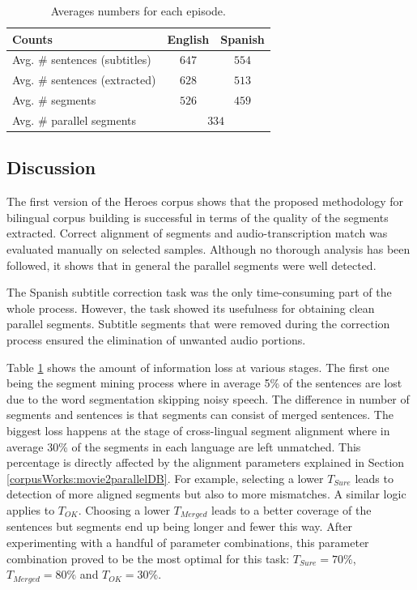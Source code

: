\begin{table}[ht]
\centering
\begin{tabular}{lcc}
\toprule
 \textbf{Counts} & \textbf{English} & \textbf{Spanish} \\  \midrule
{Avg. \# sentences (subtitles)} &  $647$ & $554$  \\
{Avg. \# sentences (extracted)} & $628$ & $513$ \\
{Avg. \# segments} & $526$ & $459$ \\
{Avg. \# parallel segments} & \multicolumn{2}{c}{$334$}\\
\bottomrule
\end{tabular}
\caption{\label{tab:episode}Averages numbers for each episode. }
\vspace{-6mm}
\end{table}

\subsection*{Discussion}
The first version of the Heroes corpus shows that the proposed methodology for bilingual corpus building is successful in terms of the quality of the segments extracted. Correct alignment of segments and audio-transcription match was evaluated manually on selected samples. Although no thorough analysis has been followed, it shows that in general the parallel segments were well detected. 

The Spanish subtitle correction task was the only time-consuming part of the whole process. However, the task showed its usefulness for obtaining clean parallel segments. Subtitle segments that were removed during the correction process ensured the elimination of unwanted audio portions. 

Table \ref{tab:episode} shows the amount of information loss at various stages. The first one being the segment mining process where in average 5\% of the sentences are lost due to the word segmentation skipping noisy speech. The difference in number of segments and sentences is that segments can consist of merged sentences. The biggest loss happens at the stage of cross-lingual segment alignment where in average 30\% of the segments in each language are left unmatched. This percentage is directly affected by the alignment parameters explained in Section \ref{corpusWorks:movie2parallelDB}. For example, selecting a lower $T_{Sure}$ leads to detection of more aligned segments but also to more mismatches. A similar logic applies to $T_{OK}$. Choosing a lower $T_{Merged}$ leads to a better coverage of the sentences but segments end up being longer and fewer this way. After experimenting with a handful of parameter combinations, this parameter combination proved to be the most optimal for this task: $T_{Sure} = 70 \%$, $T_{Merged} = 80 \%$ and $T_{OK} = 30 \%$.

